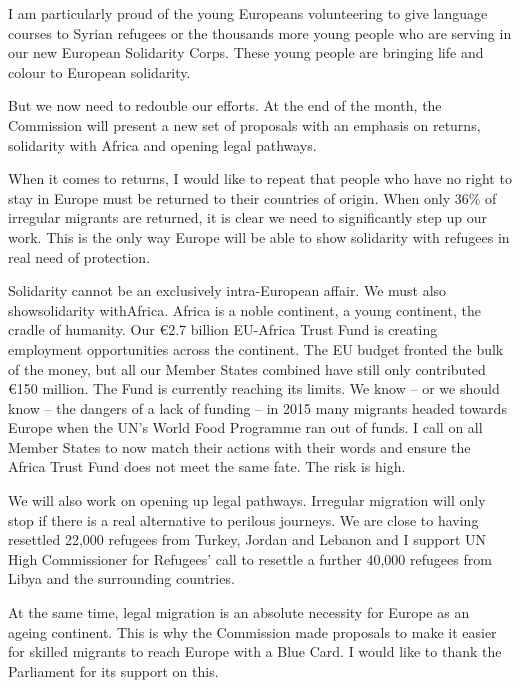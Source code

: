 \documentclass[a4paper,11pt]{article}
\begin{document}
I am particularly proud of the young Europeans volunteering to give language courses to Syrian refugees or the thousands more young people who are serving in our new European Solidarity Corps. These young people are bringing life and colour to European solidarity.

But we now need to redouble our efforts. At the end of the month, the Commission will present a new set of proposals with an emphasis on returns, solidarity with Africa and opening legal pathways.

When it comes to returns, I would like to repeat that people who have no right to stay in Europe must be returned to their countries of origin. When only 36\% of irregular migrants are returned, it is clear we need to significantly step up our work. This is the only way Europe will be able to show solidarity with refugees in real need of protection.

Solidarity cannot be an exclusively intra-European affair. We must also showsolidarity withAfrica. Africa is a noble continent, a young continent, the cradle of humanity. Our \euro2.7 billion EU-Africa Trust Fund is creating employment opportunities across the continent. The EU budget fronted the bulk of the money, but all our Member States combined have still only contributed \euro150 million. The Fund is currently reaching its limits. We know – or we should know – the dangers of a lack of funding – in 2015 many migrants headed towards Europe when the UN's World Food Programme ran out of funds. I call on all Member States to now match their actions with their words and ensure the Africa Trust Fund does not meet the same fate. The risk is high.

We will also work on opening up legal pathways. Irregular migration will only stop if there is a real alternative to perilous journeys. We are close to having resettled 22,000 refugees from Turkey, Jordan and Lebanon and I support UN High Commissioner for Refugees' call to resettle a further 40,000 refugees from Libya and the surrounding countries.

At the same time, legal migration is an absolute necessity for Europe as an ageing continent. This is why the Commission made proposals to make it easier for skilled migrants to reach Europe with a Blue Card. I would like to thank the Parliament for its support on this.

 

 

 

 
\end{document}
